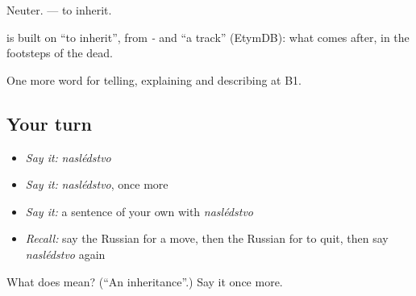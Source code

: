 Neuter. \emph{  } — to inherit.

\begin{cousinweb}
\emph{} is built on \emph{} \textquotedblleft{}to inherit\textquotedblright{}, from \emph{-} and \emph{} \textquotedblleft{}a track\textquotedblright{} (EtymDB): what comes after, in the footsteps of the dead.
\end{cousinweb}

\begin{grammarlens}[title={What you've built}]
One more word for telling, explaining and describing at B1.
\end{grammarlens}

\subsection*{Your turn}
\begin{itemize}
\raggedright
  \item \emph{Say it:} \emph{naslédstvo}
  \item \emph{Say it:} \emph{naslédstvo}, once more
  \item \emph{Say it:} a sentence of your own with \emph{naslédstvo}
  \item \emph{Recall:} say the Russian for a move, then the Russian for to quit, then say \emph{naslédstvo} again
\end{itemize}

\begin{tcolorbox}[breakable,colback=teal!4,colframe=teal!35!black,title={Before you move on}]
What does  mean? (\textquotedblleft{}An inheritance\textquotedblright{}.) Say it once more.
\end{tcolorbox}
